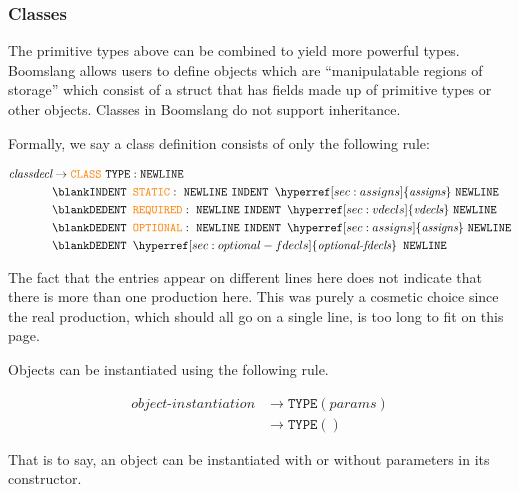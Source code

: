 \documentclass{article}
\begin{document}
\subsubsection{Classes}
The primitive types above can be combined to yield more powerful types. Boomslang allows users to define objects which are ``manipulatable regions of storage'' which consist of a struct that has fields made up of primitive types or other objects. Classes in Boomslang do not support inheritance.

Formally, we say a class definition consists of only the following rule:

\label{sec:classdecl}
\begin{align*}
    \textit{classdecl} &\to \textcolor{orange}{\texttt{CLASS}} \text{ } \texttt{TYPE}: \texttt{NEWLINE} \text{ } \\
    &\blank \texttt{INDENT} \texttt{ } \textcolor{orange}{\texttt{STATIC}}: \text{ } \texttt{NEWLINE}  \text{ } \texttt{INDENT} \texttt{ } \hyperref[sec:assigns]{\textit{assigns}} \text{ } \texttt{NEWLINE} \text{ } \\
    &\blank
    \texttt{DEDENT} \texttt{ } \textcolor{orange}{\texttt{REQUIRED}}: \text{ } \texttt{NEWLINE} \text{ } \texttt{INDENT} \texttt{ }  \hyperref[sec:vdecls]{\textit{vdecls}} \text{ } \texttt{NEWLINE} \text{ } \\
    &\blank \texttt{DEDENT} \texttt{ } \textcolor{orange}{\texttt{OPTIONAL}}: \text{ }  \texttt{NEWLINE} \text{ } \texttt{INDENT} \texttt{ } \hyperref[sec:assigns]{\textit{assigns}} \text{ } \texttt{NEWLINE} \\
    &\blank \texttt{DEDENT} \texttt{ } \hyperref[sec:optional-fdecls]{\textit{optional-fdecls}} \texttt{ } \texttt{NEWLINE}
\end{align*}

The fact that the entries appear on different lines here does not indicate that there is more than one production here. This was purely a cosmetic choice since the real production, which should all go on a single line, is too long to fit on this page.

Objects can be instantiated using the following rule.

\label{sec:object-instantiation}
\begin{align*}
    \textit{object-instantiation} &\to \texttt{TYPE}(\hyperref[sec:params]{\textit{params}}) \\
    &\to \texttt{TYPE}()
\end{align*}

That is to say, an object can be instantiated with or without parameters in its constructor.
\end{document}
